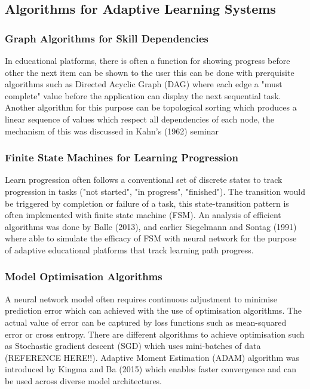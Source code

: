 \documentclass{article}
\begin{document}
\subsection{Algorithms for Adaptive Learning Systems} %
\subsubsection{Graph Algorithms for Skill Dependencies} %
In educational platforms, there is often a function for showing progress before other the next item can be shown to the user this can be done with prerquisite algorithms such as Directed Acyclic Graph (DAG) where each edge a "must complete" value before the application can display the next sequential task. Another algorithm for this purpose can be topological sorting which produces a linear sequence of values which respect all dependencies of each node, the mechanism of this was discussed in Kahn's (1962) seminar %
\subsubsection{Finite State Machines for Learning Progression}
Learn progression often follows a conventional set of discrete states to track progression in tasks ("not started", "in progress", "finished"). The transition would be triggered by completion or failure of a task, this state-transition pattern is often implemented with finite state machine (FSM). An analysis of efficient algorithms was done by Balle (2013), and earlier Siegelmann and Sontag (1991) where able to simulate the efficacy of FSM with neural network for the purpose of adaptive educational platforms that track learning path progress.
\subsubsection{Model Optimisation Algorithms}
A neural network model often requires continuous adjustment to minimise prediction error which can achieved with the use of optimisation algorithms. The actual value of error can be captured by loss functions such as mean-squared error or cross entropy. There are different algorithms to achieve optimisation such as Stochastic gradient descent (SGD) which uses mini-batches of data (REFERENCE HERE!!). Adaptive Moment Estimation (ADAM) algorithm  was introduced by Kingma and Ba (2015) which enables faster convergence and can be used across diverse model architectures.
\end{document}
